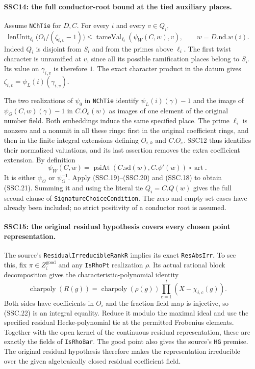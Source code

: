 \paragraph{SSC14: the full conductor-root bound at the tied auxiliary places.}
\label{claim:SSC14}
Assume \texttt{NChTie} for $D,C$. For every $i$ and every
$v\in Q_i$,
\[
 \operatorname{lenUnit}_{\ell_i}
        \bigl(O_i/(\zeta_{i,v}-1)\bigr)
  \le \operatorname{tameVal}_{\ell_i}
          (\psi_W(C,w),v),\qquad w=D.\mathrm{nd}.w(i).         \tag{SSC.21}
\]
Indeed $Q_i$ is disjoint from $S_i$ and from the primes above
$\ell_i$. The first twist character is unramified at $v$, since
all its possible ramification places belong to $S_i$. Its value
on $\gamma_{i,v}$ is therefore $1$. The exact character product
in the datum gives
$\zeta_{i,v}=\psi_L(i)(\gamma_{i,v})$.

The two realizations of $\psi_0$ in \texttt{NChTie} identify
$\psi_L(i)(\gamma)-1$ and the image of
$\psi_G(C,w)(\gamma)-1$ in $C.O_e(w)$ as images of one element
of the original number field. Both embeddings induce the same
specified place. The prime $\ell_i$ is nonzero and a nonunit in
all these rings: first in the original coefficient rings, and then
in the finite integral extensions defining $O_{i,k}$ and $C.O_e$.
SSC12 thus identifies their normalized valuations, and its last
assertion removes the extra coefficient extension. By definition
\[
 \psi_W(C,w)=\operatorname{psiAt}(C.\mathrm{sd}(w),C.\psi'(w))
                         \circ\operatorname{art}.
\]
It is either $\psi_G$ or $\psi_G^{-1}$. Apply (SSC.19)--(SSC.20)
and (SSC.18) to obtain (SSC.21). Summing it and using the literal
tie $Q_i=C.Q(w)$ gives the full second clause of
\texttt{SignatureChoiceCondition}. The zero and empty-set cases
have already been included; no strict positivity of a conductor
root is assumed.

\paragraph{SSC15: the original residual hypothesis covers every chosen point representation.}
\label{claim:SSC15}
The source's \texttt{ResidualIrreducibleRankR} implies its exact
\texttt{ResAbsIrr}. To see this, fix $\pi\in Z_i^{\mathrm{good}}$
and any \texttt{IsRhoPt} realization $\rho$. Its actual rational
block decomposition gives the characteristic-polynomial identity
\[
 \operatorname{charpoly}(R(g))
    =\operatorname{charpoly}(\rho(g))
           \prod_{c=1}^{t}(X-\chi_{i,c}(g)).                   \tag{SSC.22}
\]
Both sides have coefficients in $O_i$ and the fraction-field map
is injective, so (SSC.22) is an integral equality. Reduce it modulo
the maximal ideal and use the specified residual Hecke-polynomial
tie at the permitted Frobenius elements. Together with the open
kernel of the continuous residual representation, these are
exactly the fields of \texttt{IsRhoBar}. The good point also gives
the source's \texttt{HG} premise. The original residual hypothesis
therefore makes the representation irreducible over the given
algebraically closed residual coefficient field.

